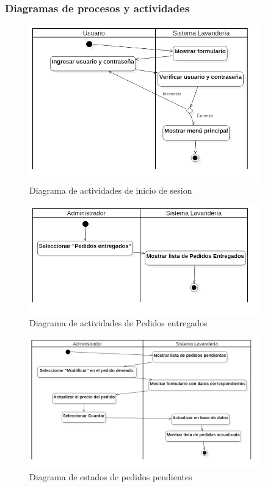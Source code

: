 \subsubsection{Diagramas de procesos y actividades}


\begin{figure}[htb]
\begin{center}
\includegraphics[width=10cm]{./imagenes/diagramas/Actividades_Lavanderia_InicioSesion.png}
\end{center}
\caption{Diagrama de actividades de inicio de sesion}
\end{figure}

\begin{figure}[htb]
\begin{center}
\includegraphics[width=10cm]{./imagenes/diagramas/Actividades_Lavanderia_PedidosEntregados.png}
\end{center}
\caption{Diagrama de actividades de Pedidos entregados}
\end{figure}

\begin{figure}[htb]
\begin{center}
\includegraphics[width=10cm]{./imagenes/diagramas/Actividades_Lavanderia_PedidosPendientes.png}
\end{center}
\caption{Diagrama de estados de pedidos pendientes}
\end{figure}

